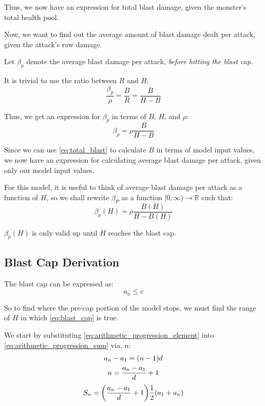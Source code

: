 \documentclass{article}
\begin{document}
Thus, we now have an expression for total blast damage, given the monster's total health pool.

Now, we want to find out the average amount of blast damage dealt per attack, given the attack's raw damage.

Let $\beta_p$ denote the average blast damage per attack, \textit{before hitting the blast cap}.

It is trivial to use the ratio between $R$ and $B$:
\begin{equation}
    \frac{\beta_p}{\rho}
    = \frac{B}{R}
    = \frac{B}{H - B} 
\end{equation}

Thus, we get an expression for $\beta_p$ in terms of $B$, $H$, and $\rho$:
\begin{equation}
    \beta_p = \rho \frac{B}{H - B}
\end{equation}

Since we can use \eqref{eq:total_blast} to calculate $B$ in terms of model input values, we now have an expression for calculating average blast damage per attack, given only our model input values.

For this model, it is useful to think of average blast damage per attack as a function of $H$, so we shall rewrite $\beta_P$ as a function $[0, \infty) \to \mathbb{R}$ such that:
\begin{equation}
    \beta_p (H) = \rho \frac{B(H)}{H - B(H)}
\end{equation}

$\beta_p (H)$ is only valid up until $H$ reaches the blast cap.


\subsection{Blast Cap Derivation}%
\label{sub:model_blast_cap_derivation}

The blast cap can be expressed as:
\begin{equation}
    a_n \le c
    \label{eq:blast_cap}
\end{equation}

So to find where the pre-cap portion of the model stops, we must find the range of $H$ in which \eqref{eq:blast_cap} is true.

We start by substituting \eqref{eq:arithmetic_progression_element} into \eqref{eq:arithmetic_progression_sum} via. $n$:
\begin{gather}
    a_n - a_1 = \parens*{n - 1} d \\
    n = \frac{a_n - a_1}{d} + 1
\end{gather}
\begin{equation}
    S_n = \parens*{\frac{a_n - a_1}{d} + 1} \frac{1}{2} \parens*{a_1 + a_n}
    \label{eq:blast_cap_work1}
\end{equation}
\end{document}

